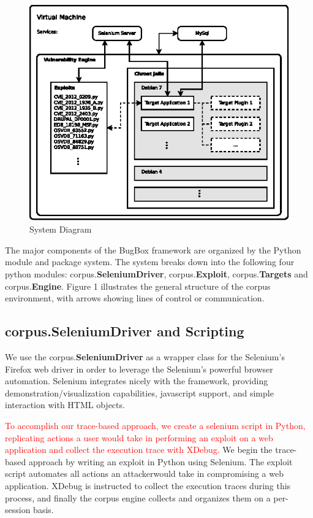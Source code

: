 \documentclass[letterpaper,twocolumn,10pt]{article}
\begin{document}
\begin{figure}[!tp]
\begin{center}
\includegraphics[scale=1.17]{system_diagram.eps}
\end{center}
\caption{System Diagram}
\end{figure}

The major components of the BugBox framework are organized by the Python module and package system. The system breaks down into the following four python modules: corpus.{\bf SeleniumDriver}, corpus.{\bf Exploit},  corpus.{\bf Targets} and corpus.{\bf Engine}.  Figure 1 illustrates the general structure of the corpus environment, with arrows showing lines of control or communication.  

\subsection{corpus.{\bf SeleniumDriver} and Scripting}
We use the corpus.{\bf SeleniumDriver} as a wrapper class for the Selenium's Firefox web driver in order to leverage the Selenium's powerful browser automation.  Selenium integrates nicely with the framework, providing demonstration/visualization capabilities, javascript support, and simple interaction with HTML objects.

\textcolor{red}{To accomplish our trace-based approach, we create a selenium script in Python, replicating actions a user would take in performing an exploit on a web application and collect the execution trace with XDebug.}
We begin the trace-based approach by writing an exploit in Python using Selenium. The exploit script automates all actions an attackerwould take in compromising a web application. XDebug is instructed to collect the execution traces during this process, and finally the corpus engine collects and organizes them on a per-session basis.
\end{document}
